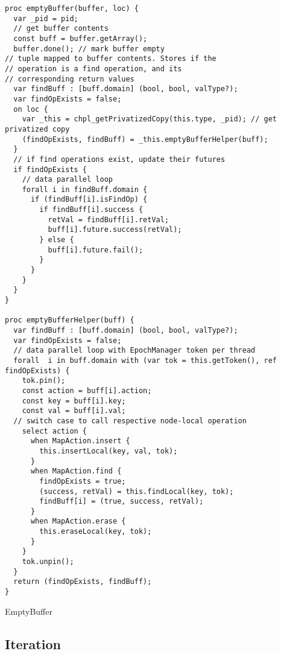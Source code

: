 \documentclass[letterpaper, 10 pt, conference]{ieeeconf}  %
\begin{document}
\begin{listing}
 \begin{verbatim}
proc emptyBuffer(buffer, loc) {
  var _pid = pid;
  // get buffer contents
  const buff = buffer.getArray();
  buffer.done(); // mark buffer empty
// tuple mapped to buffer contents. Stores if the
// operation is a find operation, and its
// corresponding return values
  var findBuff : [buff.domain] (bool, bool, valType?);
  var findOpExists = false;
  on loc {
    var _this = chpl_getPrivatizedCopy(this.type, _pid); // get privatized copy
    (findOpExists, findBuff) = _this.emptyBufferHelper(buff);
  }
  // if find operations exist, update their futures
  if findOpExists {
    // data parallel loop
    forall i in findBuff.domain {
      if (findBuff[i].isFindOp) {
        if findBuff[i].success {
          retVal = findBuff[i].retVal;
          buff[i].future.success(retVal);
        } else {
          buff[i].future.fail();
        }
      }
    }
  }
}

proc emptyBufferHelper(buff) {
  var findBuff : [buff.domain] (bool, bool, valType?);
  var findOpExists = false;
  // data parallel loop with EpochManager token per thread 
  forall  i in buff.domain with (var tok = this.getToken(), ref findOpExists) {
    tok.pin();
    const action = buff[i].action;
    const key = buff[i].key;
    const val = buff[i].val;
  // switch case to call respective node-local operation
    select action {
      when MapAction.insert {
        this.insertLocal(key, val, tok);
      }
      when MapAction.find {
        findOpExists = true;
        (success, retVal) = this.findLocal(key, tok);
        findBuff[i] = (true, success, retVal);
      }
      when MapAction.erase {
        this.eraseLocal(key, tok);
      }
    }
    tok.unpin();
  }
  return (findOpExists, findBuff);
}
\end{verbatim}
\caption{EmptyBuffer}
\label{lst:emptyBuffer}
\end{listing}


\subsection{Iteration}
\end{document}
